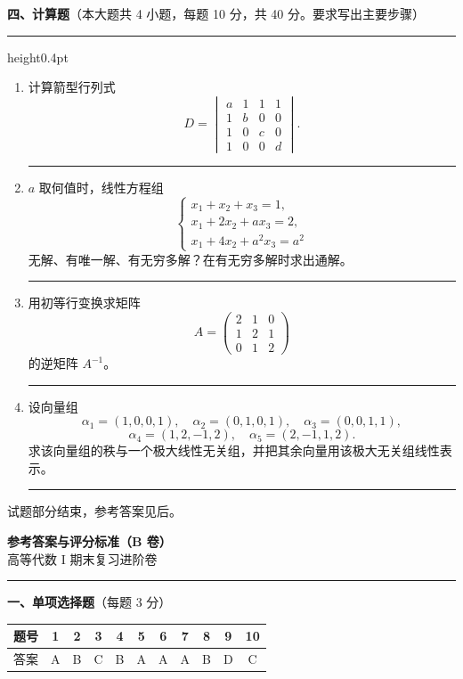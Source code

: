 \documentclass[12pt]{ctexart}
\newcommand{\bigsection}[2]{%
  \vspace{7pt}%
  {\noindent\bfseries\large #1}\hfill{\normalsize（本大题共 #2）}\par
  \vspace{2pt}\hrule height0.4pt\vspace{8pt}}
\newcommand{\workarea}[1]{\par\vspace{0.35em}\noindent\rule{\linewidth}{0.25pt}\par\vspace{#1}}
\begin{document}
\clearpage
\bigsection{四、计算题}{4 小题，每题 10 分，共 40 分。要求写出主要步骤}

\begin{enumerate}[label=\arabic*.]
\item 计算箭型行列式
  \[
  D=\begin{vmatrix}
  a&1&1&1\\
  1&b&0&0\\
  1&0&c&0\\
  1&0&0&d
  \end{vmatrix}.
  \]
\workarea{5.2cm}

\item $a$ 取何值时，线性方程组
  \[
  \begin{cases}
  x_1+x_2+x_3=1,\\
  x_1+2x_2+a x_3=2,\\
  x_1+4x_2+a^{2}x_3=a^{2}
  \end{cases}
  \]
  无解、有唯一解、有无穷多解？在有无穷多解时求出通解。
\workarea{6.0cm}

\clearpage
\item 用初等行变换求矩阵
  \[
  A=\begin{pmatrix}
  2&1&0\\
  1&2&1\\
  0&1&2
  \end{pmatrix}
  \]
  的逆矩阵 $A^{-1}$。
\workarea{6.0cm}

\item 设向量组
  \[
  \alpha_1=(1,0,0,1),\quad \alpha_2=(0,1,0,1),\quad
  \alpha_3=(0,0,1,1),
  \]
  \[
  \alpha_4=(1,2,-1,2),\quad \alpha_5=(2,-1,1,2).
  \]
  求该向量组的秩与一个极大线性无关组，并把其余向量用该极大无关组线性表示。
\workarea{5.5cm}
\end{enumerate}

\begin{center}\small 试题部分结束，参考答案见后。\end{center}

\clearpage
\begin{center}
  {\Large\bfseries 参考答案与评分标准（B 卷）}\\[2pt]
  {\small 高等代数 I 期末复习进阶卷}
\end{center}
\vspace{6pt}\hrule\vspace{12pt}

\noindent\textbf{一、单项选择题}（每题 3 分）
\begin{center}
\renewcommand{\arraystretch}{1.3}
\begin{tabular}{|c|c|c|c|c|c|c|c|c|c|c|}
\hline
题号 & 1&2&3&4&5&6&7&8&9&10\\\hline
答案 & A&B&C&B&A&A&A&B&D&C\\\hline
\end{tabular}
\end{center}
\end{document}
